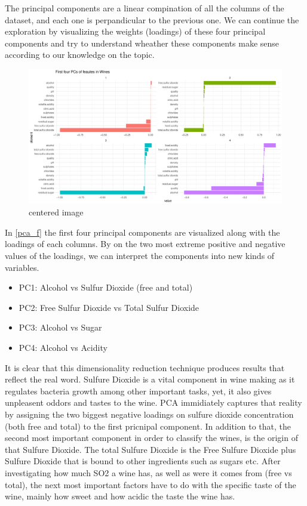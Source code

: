 \documentclass[11pt,twoside]{article}
\numberwithin{Theorem}{section}
\numberwithin{Definition}{section}
\numberwithin{Lemma}{section}
\numberwithin{Algorithm}{section}
\numberwithin{equation}{section}
\begin{document}
The principal components are a linear compination of all the columns of the dataset, and each one is perpandicular to the previous one. We can continue the exploration by visualizing the weights (loadings) of these four principal components and try to understand wheather these components make sense according to our knowledge on the topic. 

\vspace*{1em}
\begin{figure}[!h]
\centering
\includegraphics[width=\textwidth]{./output/1.b.pca-features.pdf}
\caption{centered image}
\end{figure}
\label{fig:pca_f}
\vspace{2em}

In \autoref{pca_f} the first four principal components are visualized along with the loadings of each columns. By on the two most extreme positive and negative values of the loadings, we can interpret the components into new kinds of variables. 

\begin{itemize}
\item PC1: Alcohol vs Sulfur Dioxide (free and total)
\item PC2: Free Sulfur Dioxide vs Total Sulfur Dioxide
\item PC3: Alcohol vs Sugar
\item PC4: Alcohol vs Acidity
\end{itemize}

It is clear that this dimensionality reduction technique produces results that reflect the real word. Sulfure Dioxide is a vital component in wine making as it regulates bacteria growth among other important tasks, yet, it also gives unpleasent oddors and tastes to the wine. PCA immidiately captures that reality by assigning the two biggest negative loadings on sulfure dioxide concentration (both free and total) to the first pricnipal component. In addition to that, the second most important component in order to classify the wines, is the origin of that Sulfure Dioxide. The total Sulfure Dioxide is the Free Sulfure Dioxide plus Sulfure Dioxide that is bound to other ingredients such as sugars etc. After investigating how much SO2 a wine has, as well as were it comes from (free vs total), the next most important factors have to do with the specific taste of the wine, mainly how sweet and how acidic the taste the wine has. 
\end{document}
